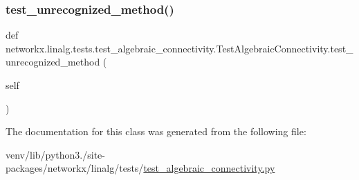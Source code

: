 \subsubsection{\texorpdfstring{test\+\_\+unrecognized\+\_\+method()}{test\_unrecognized\_method()}}
{\footnotesize\ttfamily def networkx.\+linalg.\+tests.\+test\+\_\+algebraic\+\_\+connectivity.\+Test\+Algebraic\+Connectivity.\+test\+\_\+unrecognized\+\_\+method (\begin{DoxyParamCaption}\item[{}]{self }\end{DoxyParamCaption})}



The documentation for this class was generated from the following file\+:\begin{DoxyCompactItemize}
\item 
venv/lib/python3./site-\/packages/networkx/linalg/tests/\hyperlink{test__algebraic__connectivity_8py}{test\+\_\+algebraic\+\_\+connectivity.\+py}\end{DoxyCompactItemize}
